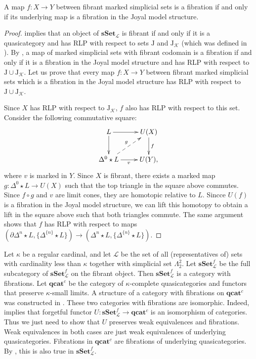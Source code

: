 \documentclass[reqno]{amsart}
\theoremstyle{definition}
\theoremstyle{remark}
\newcommand{\cat}[1]{\mathbf{#1}}
\newcommand{\sSet}{\cat{sSet}}
\newcommand{\qcat}{\cat{qcat}}
\newcommand{\join}{\star}
\newcommand{\J}{\mathrm{J}}
\numberwithin{figure}{section}
\begin{document}
\begin{prop}
A map $f : X \to Y$ between fibrant marked simplicial sets is a fibration if and only if its underlying map is a fibration in the Joyal model structure.
\end{prop}
\begin{proof}
 implies that an object of $\sSet_\mathcal{L}$ is fibrant if and only if it is a quasicategory
and has RLP with respect to sets $\J$ and $\J_\mathcal{K}$ (which was defined in ).
By \cite[Proposition~3.6]{f-model-structures}, a map of marked simplicial sets with fibrant codomain is a fibration
if and only if it is a fibration in the Joyal model structure and has RLP with respect to $\J \cup \J_\mathcal{K}$.
Let us prove that every map $f : X \to Y$ between fibrant marked simplicial sets which is a fibration in the Joyal model structure has RLP with respect to $\J \cup \J_\mathcal{K}$.

Since $X$ has RLP with respect to $\J_\mathcal{K}$, $f$ also has RLP with respect to this set.
Consider the following commutative square:
\[ \xymatrix{ L \ar[r] \ar[d] & U(X) \ar[d]^f \\
              \Delta^0 \join L \ar[r]_v \ar@{-->}[ur]^g & U(Y),
            } \]
where $v$ is marked in $Y$.
Since $X$ is fibrant, there exists a marked map $g : \Delta^0 \join L \to U(X)$ such that the top triangle in the square above commutes.
Since $f \circ g$ and $v$ are limit cones, they are homotopic relative to $L$.
Sincce $U(f)$ is a fibration in the Joyal model structure, we can lift this homotopy to obtain a lift in the square above such that both triangles commute.
The same argument shows that $f$ has RLP with respect to maps $(\partial \Delta^n \join L, \{ \Delta^{\{n\}} \join L \}) \to (\Delta^n \join L, \{ \Delta^{\{n\}} \join L \})$.
\end{proof}

Let $\kappa$ be a regular cardinal, and let $\mathcal{L}$ be the set of all (representatives of) sets with cardinality less than $\kappa$ together with simplicial set $\Lambda^2_2$.
Let $\sSet_\mathcal{L}^f$ be the full subcategory of $\sSet_\mathcal{L}^f$ on the fibrant object.
Then $\sSet_\mathcal{L}^f$ is a category with fibrations.
Let $\qcat^c$ be the category of $\kappa$-complete quasicategories and functors that preserve $\kappa$-small limits.
A structure of a category with fibrations on $\qcat^c$ was constructed in \cite{szumilo}.
These two categories with fibrations are isomorphic.
Indeed,  implies that forgetful functor $U : \sSet_\mathcal{L}^f \to \qcat^c$ is an isomorphism of categories.
Thus we just need to show that $U$ preserves weak equivalences and fibrations.
Weak equivalences in both cases are just weak equivalences of underlying quasicategories.
Fibrations in $\qcat^c$ are fibrations of underlying quasicategories.
By , this is also true in $\sSet_\mathcal{L}^f$.



\end{document}
